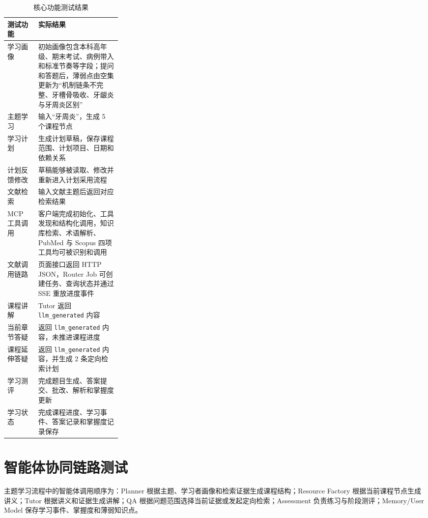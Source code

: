 \begin{table}[H]
  \centering
  \caption{核心功能测试结果}
  \label{tab:function-test}
  \begin{tabularx}{\linewidth}{p{0.27\linewidth}X}
    \toprule
    测试功能 & 实际结果 \\
    \midrule
    学习画像 & 初始画像包含本科高年级、期末考试、病例带入和标准节奏等字段；提问和答题后，薄弱点由空集更新为“机制链条不完整、牙槽骨吸收、牙龈炎与牙周炎区别” \\
    主题学习 & 输入“牙周炎”，生成 5 个课程节点 \\
    学习计划 & 生成计划草稿，保存课程范围、计划项目、日期和依赖关系 \\
    计划反馈修改 & 草稿能够被读取、修改并重新进入计划采用流程 \\
    文献检索 & 输入文献主题后返回对应检索结果 \\
    MCP 工具调用 & 客户端完成初始化、工具发现和结构化调用，知识库检索、术语解析、PubMed 与 Scopus 四项工具均可被识别和调用 \\
    文献调用链路 & 页面接口返回 HTTP JSON，Router Job 可创建任务、查询状态并通过 SSE 重放进度事件 \\
    课程讲解 & Tutor 返回 \texttt{llm\_generated} 内容 \\
    当前章节答疑 & 返回 \texttt{llm\_generated} 内容，未推进课程进度 \\
    课程延伸答疑 & 返回 \texttt{llm\_generated} 内容，并生成 2 条定向检索计划 \\
    学习测评 & 完成题目生成、答案提交、批改、解析和掌握度更新 \\
    学习状态 & 完成课程进度、学习事件、答案记录和掌握度记录保存 \\
    \bottomrule
  \end{tabularx}
\end{table}

\section{智能体协同链路测试}

主题学习流程中的智能体调用顺序为：Planner 根据主题、学习者画像和检索证据生成课程结构；Resource Factory 根据当前课程节点生成讲义；Tutor 根据讲义和证据生成讲解；QA 根据问题范围选择当前证据或发起定向检索；Assessment 负责练习与阶段测评；Memory/User Model 保存学习事件、掌握度和薄弱知识点。

